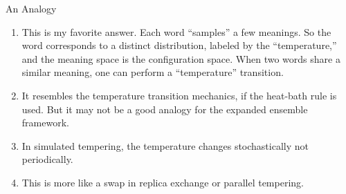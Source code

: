 \documentclass[12pt]{article}
\begin{document}
\begin{problem}{An Analogy}

\begin{enumerate}
  \item
    This is my favorite answer.
    Each word ``samples'' a few meanings.
    So the word corresponds to a distinct distribution,
    labeled by the ``temperature,''
    and the meaning space is the configuration space.
    When two words share a similar meaning,
    one can perform a ``temperature'' transition.

  \item
    It resembles the temperature transition mechanics,
    if the heat-bath rule is used.
    But it may not be a good analogy for the expanded ensemble framework.

  \item
    In simulated tempering,
    the temperature changes stochastically not periodically.

  \item
    This is more like a swap in replica exchange or parallel tempering.
\end{enumerate}

\end{problem}
\end{document}
